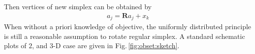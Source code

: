 \documentclass[final,1p,times]{elsarticle}
\begin{document}
Then vertices of new simplex can be obtained by
\begin{align}
	a_j = \bm{R}a_j + x_k
	\label{}
\end{align}
When without a priori knowledge of objective, the uniformly
distributed principle is still a reasonable assumption to rotate regular simplex.
A standard schematic plots of $2$, and
$3$-D case are given in Fig.\,\ref{fig:obset:sketch}.
\end{document}
